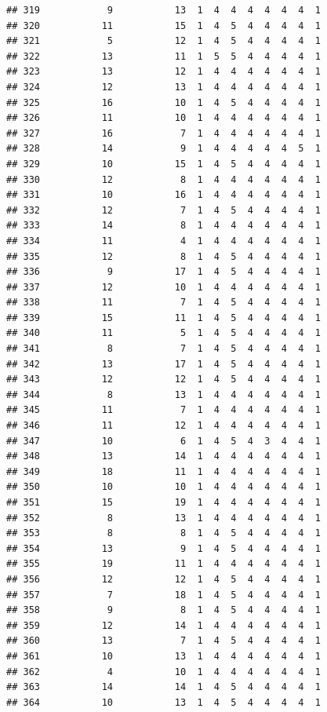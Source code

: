 \documentclass[12pt,]{krantz}
\theoremstyle{definition}
\theoremstyle{definition}
\theoremstyle{remark}
\begin{document}
\begin{verbatim}
## 319            9           13  1  4  4  4  4  4  4  1
## 320           11           15  1  4  5  4  4  4  4  1
## 321            5           12  1  4  5  4  4  4  4  1
## 322           13           11  1  5  5  4  4  4  4  1
## 323           13           12  1  4  4  4  4  4  4  1
## 324           12           13  1  4  4  4  4  4  4  1
## 325           16           10  1  4  5  4  4  4  4  1
## 326           11           10  1  4  4  4  4  4  4  1
## 327           16            7  1  4  4  4  4  4  4  1
## 328           14            9  1  4  4  4  4  4  5  1
## 329           10           15  1  4  5  4  4  4  4  1
## 330           12            8  1  4  4  4  4  4  4  1
## 331           10           16  1  4  4  4  4  4  4  1
## 332           12            7  1  4  5  4  4  4  4  1
## 333           14            8  1  4  4  4  4  4  4  1
## 334           11            4  1  4  4  4  4  4  4  1
## 335           12            8  1  4  5  4  4  4  4  1
## 336            9           17  1  4  5  4  4  4  4  1
## 337           12           10  1  4  4  4  4  4  4  1
## 338           11            7  1  4  5  4  4  4  4  1
## 339           15           11  1  4  5  4  4  4  4  1
## 340           11            5  1  4  5  4  4  4  4  1
## 341            8            7  1  4  5  4  4  4  4  1
## 342           13           17  1  4  5  4  4  4  4  1
## 343           12           12  1  4  5  4  4  4  4  1
## 344            8           13  1  4  4  4  4  4  4  1
## 345           11            7  1  4  4  4  4  4  4  1
## 346           11           12  1  4  4  4  4  4  4  1
## 347           10            6  1  4  5  4  3  4  4  1
## 348           13           14  1  4  4  4  4  4  4  1
## 349           18           11  1  4  4  4  4  4  4  1
## 350           10           10  1  4  4  4  4  4  4  1
## 351           15           19  1  4  4  4  4  4  4  1
## 352            8           13  1  4  4  4  4  4  4  1
## 353            8            8  1  4  5  4  4  4  4  1
## 354           13            9  1  4  5  4  4  4  4  1
## 355           19           11  1  4  4  4  4  4  4  1
## 356           12           12  1  4  5  4  4  4  4  1
## 357            7           18  1  4  5  4  4  4  4  1
## 358            9            8  1  4  5  4  4  4  4  1
## 359           12           14  1  4  4  4  4  4  4  1
## 360           13            7  1  4  5  4  4  4  4  1
## 361           10           13  1  4  4  4  4  4  4  1
## 362            4           10  1  4  4  4  4  4  4  1
## 363           14           14  1  4  5  4  4  4  4  1
## 364           10           13  1  4  5  4  4  4  4  1

\end{verbatim}
\end{document}
